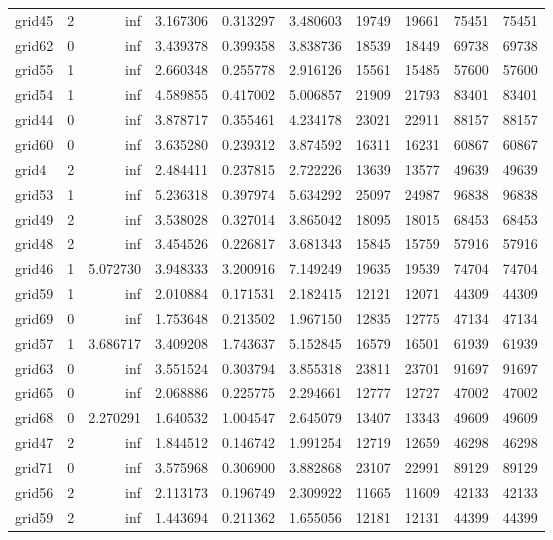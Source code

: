 \begin{longtable}{|l|r|r|r|r|r|r|r|r|r|}
grid45 & 2 & inf & 3.167306 & 0.313297 & 3.480603 & 19749 & 19661 & 75451 & 75451 \\
grid62 & 0 & inf & 3.439378 & 0.399358 & 3.838736 & 18539 & 18449 & 69738 & 69738 \\
grid55 & 1 & inf & 2.660348 & 0.255778 & 2.916126 & 15561 & 15485 & 57600 & 57600 \\
grid54 & 1 & inf & 4.589855 & 0.417002 & 5.006857 & 21909 & 21793 & 83401 & 83401 \\
grid44 & 0 & inf & 3.878717 & 0.355461 & 4.234178 & 23021 & 22911 & 88157 & 88157 \\
grid60 & 0 & inf & 3.635280 & 0.239312 & 3.874592 & 16311 & 16231 & 60867 & 60867 \\
grid4 & 2 & inf & 2.484411 & 0.237815 & 2.722226 & 13639 & 13577 & 49639 & 49639 \\
grid53 & 1 & inf & 5.236318 & 0.397974 & 5.634292 & 25097 & 24987 & 96838 & 96838 \\
grid49 & 2 & inf & 3.538028 & 0.327014 & 3.865042 & 18095 & 18015 & 68453 & 68453 \\
grid48 & 2 & inf & 3.454526 & 0.226817 & 3.681343 & 15845 & 15759 & 57916 & 57916 \\
grid46 & 1 & 5.072730 & 3.948333 & 3.200916 & 7.149249 & 19635 & 19539 & 74704 & 74704 \\
grid59 & 1 & inf & 2.010884 & 0.171531 & 2.182415 & 12121 & 12071 & 44309 & 44309 \\
grid69 & 0 & inf & 1.753648 & 0.213502 & 1.967150 & 12835 & 12775 & 47134 & 47134 \\
grid57 & 1 & 3.686717 & 3.409208 & 1.743637 & 5.152845 & 16579 & 16501 & 61939 & 61939 \\
grid63 & 0 & inf & 3.551524 & 0.303794 & 3.855318 & 23811 & 23701 & 91697 & 91697 \\
grid65 & 0 & inf & 2.068886 & 0.225775 & 2.294661 & 12777 & 12727 & 47002 & 47002 \\
grid68 & 0 & 2.270291 & 1.640532 & 1.004547 & 2.645079 & 13407 & 13343 & 49609 & 49609 \\
grid47 & 2 & inf & 1.844512 & 0.146742 & 1.991254 & 12719 & 12659 & 46298 & 46298 \\
grid71 & 0 & inf & 3.575968 & 0.306900 & 3.882868 & 23107 & 22991 & 89129 & 89129 \\
grid56 & 2 & inf & 2.113173 & 0.196749 & 2.309922 & 11665 & 11609 & 42133 & 42133 \\
grid59 & 2 & inf & 1.443694 & 0.211362 & 1.655056 & 12181 & 12131 & 44399 & 44399 \\

\end{longtable}
